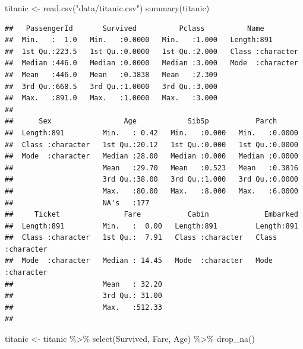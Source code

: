 \documentclass[
  12pt,
]{book}
\newenvironment{Shaded}{\begin{snugshade}}{\end{snugshade}}
\newcommand{\FunctionTok}[1]{\textcolor[rgb]{0.00,0.00,0.00}{#1}}
\newcommand{\NormalTok}[1]{#1}
\newcommand{\OtherTok}[1]{\textcolor[rgb]{0.56,0.35,0.01}{#1}}
\newcommand{\SpecialCharTok}[1]{\textcolor[rgb]{0.00,0.00,0.00}{#1}}
\newcommand{\StringTok}[1]{\textcolor[rgb]{0.31,0.60,0.02}{#1}}
\theoremstyle{definition}
\theoremstyle{definition}
\theoremstyle{definition}
\theoremstyle{definition}
\theoremstyle{remark}
\begin{document}
\begin{Shaded}
\begin{Highlighting}[]
\NormalTok{titanic }\OtherTok{\textless{}{-}} \FunctionTok{read.csv}\NormalTok{(}\StringTok{"data/titanic.csv"}\NormalTok{)}
\FunctionTok{summary}\NormalTok{(titanic)}
\end{Highlighting}
\end{Shaded}

\begin{verbatim}
##   PassengerId       Survived          Pclass          Name          
##  Min.   :  1.0   Min.   :0.0000   Min.   :1.000   Length:891        
##  1st Qu.:223.5   1st Qu.:0.0000   1st Qu.:2.000   Class :character  
##  Median :446.0   Median :0.0000   Median :3.000   Mode  :character  
##  Mean   :446.0   Mean   :0.3838   Mean   :2.309                     
##  3rd Qu.:668.5   3rd Qu.:1.0000   3rd Qu.:3.000                     
##  Max.   :891.0   Max.   :1.0000   Max.   :3.000                     
##                                                                     
##      Sex                 Age            SibSp           Parch       
##  Length:891         Min.   : 0.42   Min.   :0.000   Min.   :0.0000  
##  Class :character   1st Qu.:20.12   1st Qu.:0.000   1st Qu.:0.0000  
##  Mode  :character   Median :28.00   Median :0.000   Median :0.0000  
##                     Mean   :29.70   Mean   :0.523   Mean   :0.3816  
##                     3rd Qu.:38.00   3rd Qu.:1.000   3rd Qu.:0.0000  
##                     Max.   :80.00   Max.   :8.000   Max.   :6.0000  
##                     NA's   :177                                     
##     Ticket               Fare           Cabin             Embarked        
##  Length:891         Min.   :  0.00   Length:891         Length:891        
##  Class :character   1st Qu.:  7.91   Class :character   Class :character  
##  Mode  :character   Median : 14.45   Mode  :character   Mode  :character  
##                     Mean   : 32.20                                        
##                     3rd Qu.: 31.00                                        
##                     Max.   :512.33                                        
## 
\end{verbatim}

\begin{Shaded}
\begin{Highlighting}[]
\NormalTok{titanic }\OtherTok{\textless{}{-}}\NormalTok{ titanic }\SpecialCharTok{\%\textgreater{}\%}
    \FunctionTok{select}\NormalTok{(Survived, Fare, Age) }\SpecialCharTok{\%\textgreater{}\%}
    \FunctionTok{drop\_na}\NormalTok{()}
\end{Highlighting}
\end{Shaded}
\end{document}
